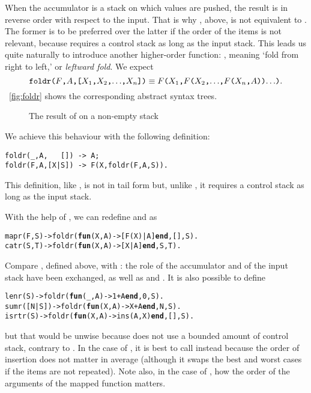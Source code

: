 When the accumulator is a stack on which values are pushed, the result
is in reverse order with respect to the input. That is why
, above, is not equivalent to . The
former is to be preferred over the latter if the order of the items is
not relevant, because  requires a control stack as long
as the input stack. This leads us quite naturally to introduce another
higher\hyp{}order function: , meaning `fold from
right to left,' or \emph{leftward fold}. We expect
\begin{equation*}
\texttt{foldr(\(F\),\(A\),[\(X_1\),\(X_2\),\(\ldots\),\(X_{n}\)])}
\equiv
\texttt{\(F\)(\(X_1\),\(F\)(\(X_2\),\(\ldots\),\(F\)(\(X_{n}\),\(A\)))\(\ldots\))}.
\end{equation*}
\Fig~\vref{fig:foldr} shows the corresponding abstract syntax trees.
\begin{figure}[b]
\centering
{}
\qquad
{}
\caption{The result of  on a non\hyp{}empty stack
\label{fig:foldr}}
\end{figure}
We achieve this behaviour with the following definition:
\begin{verbatim}
foldr(_,A,   []) -> A;
foldr(F,A,[X|S]) -> F(X,foldr(F,A,S)).
\end{verbatim}
This definition, like , is not in tail form but,
unlike , it requires a control stack as long as the
input stack.

With the help of , we can redefine 
and  as
\begin{alltt}
mapr(F,S) -> foldr(\textbf{fun}(X,A) -> [F(X)|A] \textbf{end},[],S).
catr(S,T) -> foldr(\textbf{fun}(X,A) ->    [X|A] \textbf{end}, S,T).
\end{alltt}
Compare , defined above, with : the
role of the accumulator and of the input stack have been exchanged, as
well as  and . It is also possible
to define
\begin{alltt}
lenr(S)     -> foldr(\textbf{fun}(\_,A) -> 1+A \textbf{end}, 0,S).\hfill% \emph{Bad}
sumr([N|S]) -> foldr(\textbf{fun}(X,A) -> X+A \textbf{end}, N,S).\hfill% \emph{Bad}
isrtr(S)    -> foldr(\textbf{fun}(X,A) -> ins(A,X) \textbf{end},[],S).\hfill% \emph{Bad}
\end{alltt}
but that would be unwise because  does not use a
bounded amount of control stack, contrary to . In the
case of , it is best to call  instead
because the order of insertion does not matter in average (although it
swaps the best and worst cases if the items are not repeated). Note
also, in the case of , how the order of the arguments
of the mapped function  matters.

